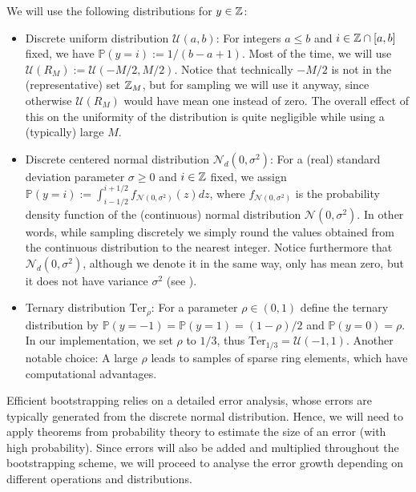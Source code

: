 \documentclass[letterpaper,10pt,english]{jupyterBook}
\begin{document}
\sphinxAtStartPar
We will use the following distributions for \(y \in \mathbb Z\):
\begin{itemize}
\item {} 
\sphinxAtStartPar
Discrete uniform distribution \(\mathcal U(a,b)\): For integers \(a \le b\) and \(i \in \mathbb Z \cap [a,b]\) fixed, we have \(\mathbb P(y=i) := 1/(b-a+1)\).
Most of the time, we will use \(\mathcal U(R_M) := \mathcal U(-M/2,M/2)\).
Notice that technically \(-M/2\) is not in the (representative) set \(\mathbb Z_{M}\), but for sampling we will use it anyway, since otherwise \(\mathcal U(R_M)\) would have mean one instead of zero.
The overall effect of this on the uniformity of the distribution is quite negligible while using a (typically) large \(M\).

\item {} 
\sphinxAtStartPar
Discrete centered normal distribution \(\mathcal {N}_d(0,\sigma^2)\):
For a (real) standard deviation parameter \(\sigma \ge 0\) and \(i \in \mathbb Z\) fixed, we assign \(\mathbb P(y = i) := \int_{i-1/2}^{i+1/2} f_{\mathcal N(0,\sigma^2)}(z) dz\), where \(f_{\mathcal N(0,\sigma^2)}\) is the probability density function of the (continuous) normal distribution \(\mathcal N(0,\sigma^2)\).
In other words, while sampling discretely we simply round the values obtained from the continuous distribution to the nearest integer.
Notice furthermore that \(\mathcal N_d(0,\sigma^2)\), although we denote it in the same way, only has mean zero, but it does not have variance \(\sigma^2\) (see {\hyperref[\detokenize{Thesis:discrete-variance}]{}}).

\item {} 
\sphinxAtStartPar
Ternary distribution \(\mathrm{Ter}_\rho\): For a parameter \(\rho \in (0,1)\) define the ternary distribution by \(\mathbb P(y = -1) = \mathbb P(y = 1) = (1-\rho)/2\) and \(\mathbb P(y = 0) = \rho\).
In our implementation, we set \(\rho\) to \(1/3\), thus \(\mathrm{Ter}_{1/3} = \mathcal U(-1,1)\).
Another notable choice: A large \(\rho\) leads to samples of sparse ring elements, which have computational advantages.

\end{itemize}

\sphinxAtStartPar
Efficient bootstrapping relies on a detailed error analysis, whose errors are typically generated from the discrete normal distribution.
Hence, we will need to apply theorems from probability theory to estimate the size of an error (with high probability).
Since errors will also be added and multiplied throughout the bootstrapping scheme, we will proceed to analyse the error growth depending on different operations and distributions.
\end{document}
